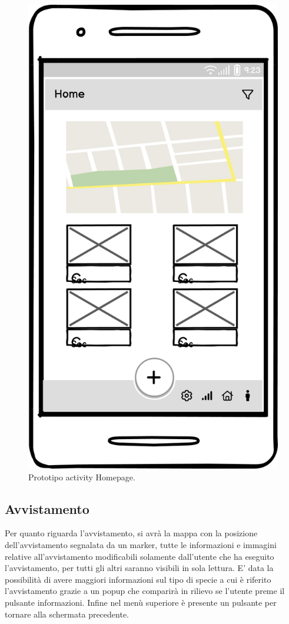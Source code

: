 \documentclass[a4paper,final,12pt]{report}
\begin{document}
\begin{figure}[hbtp]
\centering
\includegraphics[scale=0.40]{img_concettuale/Home_mob.png}
\caption{Prototipo activity Homepage.}
\end{figure}


\subsection{Avvistamento}
Per quanto riguarda l'avvistamento, si avrà la mappa con la posizione dell'avvistamento segnalata da un marker, tutte le informazioni e immagini relative all'avvistamento modificabili solamente dall'utente che ha eseguito l'avvistamento, per tutti gli altri saranno visibili in sola lettura. E' data la possibilità di avere maggiori informazioni sul tipo di specie a cui è riferito l'avvistamento grazie a un popup che comparirà in rilievo se l'utente preme il pulsante informazioni. Infine nel menù superiore è presente un pulsante per tornare alla schermata precedente.
\end{document}
